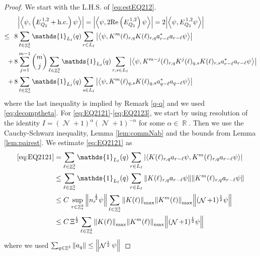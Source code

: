 \documentclass[sn-mathphys, Numbered ,a4paper]{sn-jnl}%
\DeclareMathOperator{\R}{\mathbb{R}}
\DeclareMathOperator{\Z}{\mathbb{Z}}
\DeclareMathOperator{\NN}{\mathcal{N}}
\newcommand{\half}{\frac{1}{2}}
\newcommand{\eva}[1]{\left\langle #1 \right\rangle}
\theoremstyle{plain}
\theoremstyle{definition}
\theoremstyle{remark}
\theoremstyle{plain}
\theoremstyle{definition}
\theoremstyle{remark}
\begin{document}
\begin{proof}
     We start with the L.H.S. of \eqref{eq:estEQ212}.
    \begin{align}
    	&\abs{\eva{\psi,\left(E^{\,1,2}_{Q_2}+\mathrm{h.c.}\right) \psi }} = \abs{\eva{\psi,2\mathrm{Re}\left(E^{\,1,2}_{Q_2}\right) \psi }} = 2\abs{\eva{\psi, E^{\,1,2}_{Q_2} \psi }}\nonumber\\
    	\leq\,\;8& \sum\limits_{\ell\in \Z^3_*} \mathds{1}_{L_{\ell}}(q) \sum\limits_{r\in L_{\ell}} \abs{\eva{\psi, K^m(\ell)_{r,q} K(\ell)_{r,q} a^*_{r-\ell} a_{r-\ell} \psi }}\label{eq:EQ2121}\\
    	+\,8& \sum\limits_{j=1}^{m-1} {{m}\choose j} \sum\limits_{\ell \in \Z^3_*}\mathds{1}_{L_{\ell}}(q) \sum\limits_{r,s\in L_{\ell}}  \abs{\eva{\psi, K^{m-j}(\ell)_{r,q} K^{j}(\ell)_{q,s} K(\ell)_{r,s} a^*_{r-\ell} a_{r-\ell} \psi }} \label{eq:EQ2122}\\
    	+\,8&\sum\limits_{\ell \in \Z^3_*} \mathds{1}_{L_{\ell}}(q) \sum\limits_{ s \in L_{\ell}} \abs{\eva{\psi, K^m(\ell)_{q,s} K(\ell)_{q,s} a^*_{q-\ell} a_{q-\ell} \psi }}\label{eq:EQ2123}
    \end{align}
    where the last inequality is implied by Remark \ref{q-q} and we used \eqref{eq:decomptheta}.
    For \eqref{eq:EQ2121}-\eqref{eq:EQ2123}, we start by using resolution of the identity $I = (\NN+1)^{\alpha}(\NN+1)^{-\alpha}$ for some $\alpha \in \R$. Then we use the Cauchy-Schwarz inequality, Lemma \ref{lem:commNab} and the bounds from Lemma \ref{lem:pairest}.
    We estimate \eqref{eq:EQ2121} as 
    \begin{align}
    	\eqref{eq:EQ2121}
    	&= \sum\limits_{\ell \in \Z^3_*} \mathds{1}_{L_{\ell}}(q) \sum\limits_{r\in L_{\ell}} \abs{\eva{ K(\ell)_{r,q} a_{r-\ell} \psi, K^m(\ell)_{r,q}  a_{r-\ell} \psi }}\nonumber\\
    	&\leq \sum\limits_{\ell \in \Z^3_*} \mathds{1}_{L_{\ell}}(q) \sum\limits_{r\in L_{\ell}} \norm{ K(\ell)_{r,q} a_{r-\ell} \psi}\norm{ K^m(\ell)_{r,q}  a_{r-\ell} \psi }\nonumber\\
    	&\leq C\,\sup\limits_{r\in \Z^3_*}\norm{n_r^{\,\half}\psi} \sum\limits_{\ell \in \Z^3_*} \norm{K(\ell)}_{\mathrm{max}} \norm{K^m(\ell)}_{\mathrm{max}}  \norm{  (\NN+1)^\half \psi}\nonumber\\
    	&\leq C\,\Xi^\half \sum\limits_{\ell \in \Z^3_*} \norm{K(\ell)}_{\mathrm{max}} \norm{K^m(\ell)}_{\mathrm{max}}  \norm{  (\NN+1)^\half \psi}\label{eq:estEQ2121}
    \end{align}
where we used $\sum_{q\in\Z^3}\norm{a_q}\leq \norm{\NN^\half\psi}$ 

\end{proof}
\end{document}
